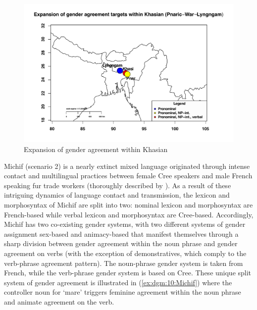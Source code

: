 \documentclass[output=collectionpaper]{langsci/langscibook}
\begin{document}
\begin{figure}
\includegraphics[height=.5\textheight]{figures/11/Khasian2.pdf}
\caption{Expansion of gender agreement within Khasian}
\label{fig:dgm:Khasian1}
\end{figure}


Michif (scenario 2) is a nearly extinct mixed language originated through intense contact and multilingual practices between female Cree  speakers and male French speaking fur trade workers (thoroughly described by \citealt{Bakker1997}). As a result of these intriguing dynamics of language contact and transmission, the lexicon and morphosyntax of Michif are split into two: nominal lexicon and morphosyntax are French-based while verbal lexicon and morphosyntax are Cree-based. Accordingly, Michif has two co-existing gender systems, with two different systems of gender assignment \textendash{} sex-based and animacy-based \textendash{} that manifest themselves through a sharp division between gender agreement within the noun phrase and gender agreement on verbs (with the exception of demonstratives, which comply to the verb-phrase agreement pattern). The noun-phrase gender system is taken from French, while the verb-phrase gender system is based on Cree. These unique split system of gender agreement is illustrated in (\ref{ex:dgm:10:Michif}) where the controller noun for `mare' triggers feminine agreement within the noun phrase and animate agreement on the verb.
\end{document}
